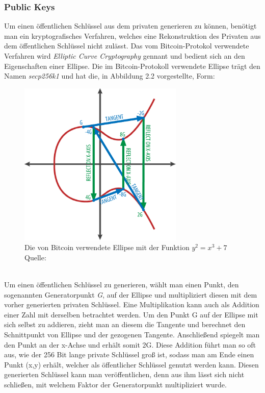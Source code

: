 \subsubsection{Public Keys}
Um einen öffentlichen Schlüssel aus dem privaten generieren zu können, benötigt man ein kryptografisches Verfahren, welches eine Rekonstruktion des Privaten aus dem öffentlichen Schlüssel nicht zulässt.
Das vom Bitcoin-Protokol verwendete Verfahren wird \emph{Elliptic Curve Cryptography} gennant und bedient sich an den Eigenschaften einer Ellipse. Die im Bitcoin-Protokoll verwendete Ellipse trägt den Namen \emph{secp256k1} und hat die, in Abbildung 2.2 vorgestellte, Form:
\begin{figure}[htpb]
	\centering
	\includegraphics[width=0.7\textwidth]{images/elliptic_curve_cryptography.png}
	\caption{Die von Bitcoin verwendete Ellipse mit der Funktion $y^{2} = x^{3} + 7$ \\Quelle: \cite[64]{antanopoulos_2014}}
	\label{6braun:fig:ellipse}
\end{figure}\\

Um einen öffentlichen Schlüssel zu generieren, wählt man einen Punkt, den sogenannten Generatorpunkt \emph{G}, auf der Ellipse und multipliziert diesen mit dem vorher generierten privaten Schlüssel. Eine Multiplikation kann auch als Addition einer Zahl mit derselben betrachtet werden. Um den Punkt G auf der Ellipse mit sich selbst zu addieren, zieht man an diesem die Tangente und berechnet den Schnittpunkt von Ellipse und der gezogenen Tangente. Anschließend spiegelt man den Punkt an der x-Achse und erhält somit 2G. Diese Addition führt man so oft aus, wie der 256 Bit lange private Schlüssel groß ist, sodass man am Ende einen Punkt (x,y) erhält, welcher als öffentlicher Schlüssel genutzt werden kann. Diesen generierten Schlüssel kann man veröffentlichen, denn aus ihm lässt sich nicht schließen, mit welchem Faktor der Generatorpunkt multipliziert wurde.

